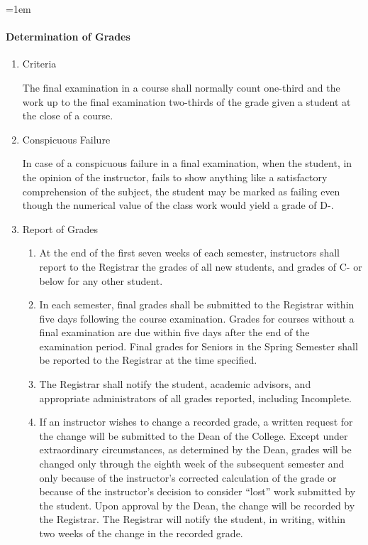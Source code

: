 \documentclass{manual}
\newcommand{\modified}[1]{}
\newcommand{\oldbreak}[1]{}
\let\oldparagraph\paragraph
\renewcommand\paragraph{\leftskip=1em\oldparagraph}
\newcommand{\itemLevelA}{\alph*.}
\newcommand{\itemLevelB}{\arabic*)}
\newcommand{\itemRefA}{\alph*}
\newcommand{\itemRefB}{\arabic*}
\begin{document}

\paragraph{Determination of Grades}\label{par:DeterminationOfGrades}



\begin{enumerate}[label=\itemLevelA,ref=\itemRefA]
\item Criteria

 The final examination in a  course shall normally count one-third and the work up to the final examination two-thirds of the grade given a student at the close of a course.

\item Conspicuous Failure

In case of a conspicuous failure in a final examination, when the student, in the opinion of the instructor, fails to show anything like a satisfactory comprehension of the subject, the student may be marked as failing even though the numerical value of the class work would yield a grade of D-.

\item Report of Grades \label{item:ReportOfGrades}

\begin{enumerate}[label=\itemLevelB,ref=\itemRefB]

\item At the end of the first seven weeks \modified{12/9/08}of each semester, instructors shall report to the Registrar the grades of all new students, and grades of C- or below for any other student.

\oldbreak{VII-5}

\item  In each semester, final grades shall be submitted  to the Registrar within five days following the course examination. Grades for courses without a final examination are due within five days after the end of the examination period. Final grades for Seniors in the Spring Semester shall be reported to the Registrar at the time specified.

\item  The Registrar shall notify the student, academic advisors, and appropriate administrators of all grades reported, including Incomplete. 

\item  If an instructor \modified{4/9/96}wishes to change a recorded grade,  a written request for the change will be submitted to the Dean of the College. Except under extraordinary circumstances, as determined by the Dean, grades will be changed only through the eighth week of the subsequent semester and only because of the instructor's corrected calculation of the grade or because of the instructor's decision to consider ``lost'' work submitted by the student. Upon approval by the Dean, the change will be recorded by the Registrar. The Registrar will notify the student, in writing, within two weeks of the change in the recorded grade.
\end{enumerate}
\end{enumerate}
\end{document}

